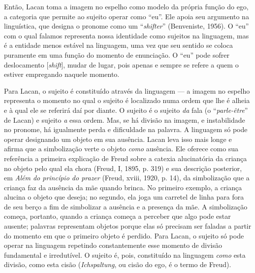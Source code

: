 Então, Lacan toma a imagem no espelho como modelo da própria função do
ego, a categoria que permite ao sujeito operar como ``eu''. Ele apoia
seu argumento na linguística, que designa o pronome como um
``\emph{shifter}'' (Benveniste, 1956). O ``eu'' com o qual falamos
representa nossa identidade como sujeitos na linguagem, mas é a entidade
menos estável na linguagem, uma vez que seu sentido se coloca puramente
em uma função do momento de enunciação. O ``eu'' pode sofrer
deslocamento {[}\emph{shift}{]}, mudar de lugar, pois apenas e sempre se
refere a quem o estiver empregando naquele momento.

Para Lacan, o sujeito é constituído através da linguagem --- a imagem no
espelho representa o momento no qual o sujeito é localizado numa ordem
que lhe é alheia e à qual ele se referirá daí por diante. O sujeito é o
sujeito \emph{da} fala (o ``\emph{parle-être}'' de Lacan) e sujeito
\emph{a} essa ordem. Mas, se há divisão na imagem, e instabilidade no
pronome, há igualmente perda e dificuldade na palavra. A linguagem só
pode operar designando um objeto em sua ausência. Lacan leva isso mais
longe e afirma que a simbolização verte o objeto \emph{como} ausência.
Ele oferece como sua referência a primeira explicação de Freud sobre a
catexia alucinatória da criança no objeto pelo qual ela chora (Freud, I,
1895, p. 319) e sua descrição posterior, em \emph{Além do princípio do
prazer} (Freud, xviii, 1920, p. 14), da simbolização que a criança faz
da ausência da mãe quando brinca. No primeiro exemplo, a criança alucina
o objeto que deseja; no segundo, ela joga um carretel de linha para fora
de seu berço a fim de simbolizar a ausência e a presença da mãe. A
simbolização começa, portanto, quando a criança começa a perceber que
algo pode estar ausente; palavras representam objetos porque elas só
precisam ser faladas a partir do momento em que o primeiro objeto é
perdido. Para Lacan, o sujeito só pode operar na linguagem repetindo
constantemente esse momento de divisão fundamental e irredutível. O
sujeito é, pois, constituído na linguagem \emph{como} esta divisão, como
esta cisão (\emph{Ichspaltung}, ou cisão do ego, é o termo de Freud).


